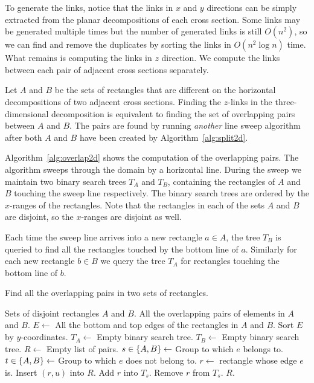 \documentclass[english,gradu]{tktltiki2018}
\begin{document}
To generate the links, notice that the links in $x$ and $y$ directions can be simply extracted from the planar decompositions of each cross section.
Some links may be generated multiple times but the number of generated links is still $O(n^2)$, so we can find and remove the duplicates by sorting the links in $O(n^2\log n)$ time.
What remains is computing the links in $z$ direction.
We compute the links between each pair of adjacent cross sections separately.

Let $A$ and $B$ be the sets of rectangles that are different on the horizontal decompositions of two adjacent cross sections.
Finding the $z$-links in the three-dimensional decomposition is equivalent to finding the set of overlapping pairs between $A$ and $B$.
The pairs are found by running \emph{another} line sweep algorithm after both $A$ and $B$ have been created by Algorithm~\ref{alg:split2d}.

Algorithm~\ref{alg:overlap2d} shows the computation of the overlapping pairs.
The algorithm sweeps through the domain by a horizontal line.
During the sweep we maintain two binary search trees $T_A$ and $T_B$, containing the rectangles of $A$ and $B$ touching the sweep line respectively.
The binary search trees are ordered by the $x$-ranges of the rectangles.
Note that the rectangles in each of the sets $A$ and $B$ are disjoint, so the $x$-ranges are disjoint as well.

Each time the sweep line arrives into a new rectangle $a\in A$, the tree $T_B$ is queried to find all the rectangles touched by the bottom line of $a$.
Similarly for each new rectangle $b\in B$ we query the tree $T_A$ for rectangles touching the bottom line of $b$.

\begin{algorithm}
\caption{Find all the overlapping pairs in two sets of rectangles.}\label{alg:overlap2d}
\begin{algorithmic}
\Require Sets of disjoint rectangles $A$ and $B$.
\Output All the overlapping pairs of elements in $A$ and $B$.
\State $E\gets$ All the bottom and top edges of the rectangles in $A$ and $B$.
\State Sort $E$ by $y$-coordinates.
\State $T_A\gets$ Empty binary search tree.
\State $T_B\gets$ Empty binary search tree.
\State $R\gets$ Empty list of pairs.
	\State $s\in\left\{A,B\right\}\gets$ Group to which $e$ belongs to.
	\State $t\in\left\{A,B\right\}\gets$ Group to which $e$ does not belong to.
	\State $r\gets$ rectangle whose edge $e$ is.
			\State Insert $(r,u)$ into $R$.
		\EndFor
		\State Add $r$ into $T_s$.
	\Else
		\State Remove $r$ from $T_s$.
	\EndIf
\EndFor
\State \Return $R$.
\end{algorithmic}
\end{algorithm}
\end{document}
